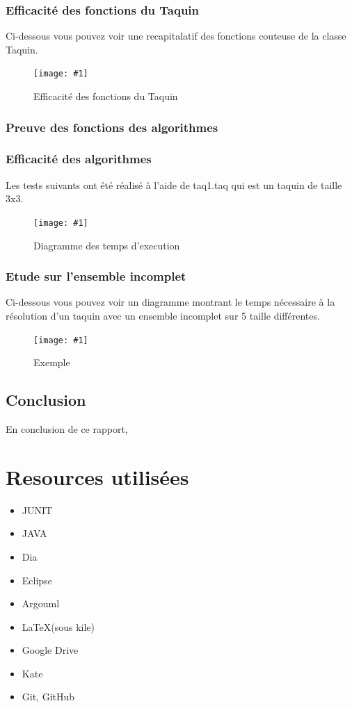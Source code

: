﻿\documentclass[a4paper,twoside,12pt]{report}
\newcommand{\monimage}[4]{
\par\noindent
\begin{figure}[H] %
\begin{center}
\texttt{[image: \#1]} %
\caption{#2} %
\label{#3} %
\end{center}
\end{figure} %
}
\begin{document}
\subsection{Efficacité des fonctions du Taquin}
%
Ci-dessous vous pouvez voir une recapitalatif des fonctions couteuse de la classe Taquin.
\monimage{taquinSpeed.png}{Efficacité des fonctions du Taquin}{Eff}{0.6}
\subsection{Preuve des fonctions des algorithmes}
%
\subsection{Efficacité des algorithmes}
Les tests suivants ont été réalisé à l'aide de taq1.taq qui est un taquin de taille 3x3.
\monimage{algoSpeed.png}{Diagramme des temps d'execution}{tempsExec}{0.6}

\subsection{Etude sur l'ensemble incomplet}
Ci-dessous vous pouvez voir un diagramme montrant le temps nécessaire à la résolution d'un taquin avec un ensemble incomplet sur 5 taille différentes.
\monimage{ensembleincomplettest2.pdf}{Exemple}{EX}{0.6}

\section{Conclusion}
%
En conclusion de ce rapport, 
\chapter{Resources utilisées}
\begin{itemize}
 \item JUNIT
 \item JAVA
 \item Dia
 \item Eclipse
 \item Argouml
 \item \LaTeX (sous kile)
 \item Google Drive
 \item Kate
 \item Git, GitHub
\end{itemize}
\end{document}
